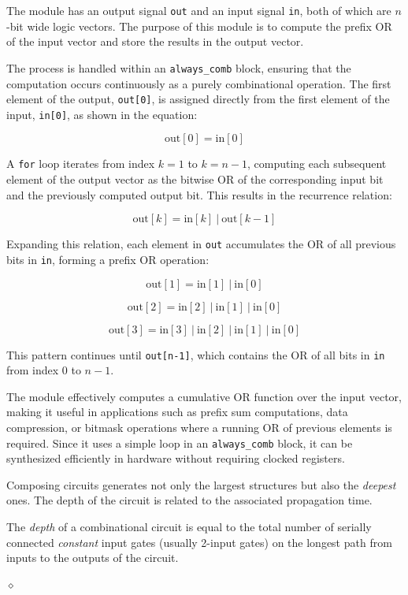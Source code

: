 The module has an output signal \texttt{out} and an input signal \texttt{in}, both of which are \( n \)-bit wide logic vectors. The purpose of this module is to compute the prefix OR of the input vector and store the results in the output vector.

The process is handled within an \texttt{always\_comb} block, ensuring that the computation occurs continuously as a purely combinational operation. The first element of the output, \texttt{out[0]}, is assigned directly from the first element of the input, \texttt{in[0]}, as shown in the equation:

\[
\text{out}[0] = \text{in}[0]
\]

A \texttt{for} loop iterates from index \( k = 1 \) to \( k = n-1 \), computing each subsequent element of the output vector as the bitwise OR of the corresponding input bit and the previously computed output bit. This results in the recurrence relation:

\[
\text{out}[k] = \text{in}[k] \ | \ \text{out}[k-1]
\]

Expanding this relation, each element in \texttt{out} accumulates the OR of all previous bits in \texttt{in}, forming a prefix OR operation:

\[
\text{out}[1] = \text{in}[1] \ | \ \text{in}[0]
\]

\[
\text{out}[2] = \text{in}[2] \ | \ \text{in}[1] \ | \ \text{in}[0]
\]

\[
\text{out}[3] = \text{in}[3] \ | \ \text{in}[2] \ | \ \text{in}[1] \ | \ \text{in}[0]
\]

This pattern continues until \texttt{out[n-1]}, which contains the OR of all bits in \texttt{in} from index \( 0 \) to \( n-1 \).

The module effectively computes a cumulative OR function over the input vector, making it useful in applications such as prefix sum computations, data compression, or bitmask operations where a running OR of previous elements is required. Since it uses a simple loop in an \texttt{always\_comb} block, it can be synthesized efficiently in hardware without requiring clocked registers.


Composing circuits generates not only the largest structures but also the
{\em deepest} ones. The depth of the circuit is related to the
associated propagation time.

\begin{definition}
The {\em depth} of a combinational circuit is equal to the total
number of serially connected {\em constant} input gates (usually 2-input gates) on the longest path from inputs
to the outputs of the circuit.

$\diamond$
\end{definition}



